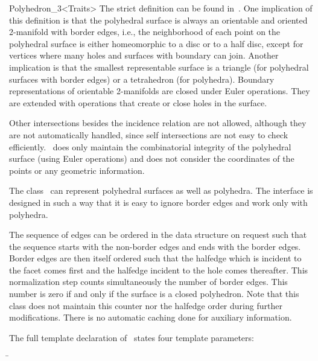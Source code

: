\begin{ccRefClass}{Polyhedron_3<Traits>}
The strict definition can be found in~\cite{k-ugpdd-99}. One
implication of this definition is that the polyhedral surface is
always an orientable and oriented 2-manifold with border edges, i.e.,
the neighborhood of each point on the polyhedral surface is either
homeomorphic to a disc or to a half disc, except for vertices where
many holes and surfaces with boundary can join. Another implication is
that the smallest representable surface is a triangle (for polyhedral
surfaces with border edges) or a tetrahedron (for polyhedra). Boundary
representations of orientable 2-manifolds are closed under Euler
operations. They are extended with operations that create or close
holes in the surface.

Other intersections besides the incidence relation are not allowed,
although they are not automatically handled, since self intersections
are not easy to check efficiently. \ccClassTemplateName\ does only
maintain the combinatorial integrity of the polyhedral surface (using
Euler operations) and does not consider the coordinates of the points
or any geometric information.

The class \ccClassTemplateName\ can represent polyhedral surfaces as
well as polyhedra. The interface is designed in such a way that it
is easy to ignore border edges and work only with polyhedra.

The sequence of edges can be ordered in the data structure on request
such that the sequence starts with the non-border edges and ends with
the border edges. Border edges are then itself ordered such that the
halfedge which is incident to the facet comes first and the halfedge
incident to the hole comes thereafter. This normalization step counts
simultaneously the number of border edges. This number is zero if and
only if the surface is a closed polyhedron. Note that this class does
not maintain this counter nor the halfedge order during further
modifications. There is no automatic caching done for auxiliary
information.


\ccParameters

The full template declaration of \ccClassTemplateName\ states four
template parameters:

\begin{tabbing}
 \=\\
                 \>\\
                 \>
                 \\
                 \>\\
\end{tabbing}
   

\end{ccRefClass}
